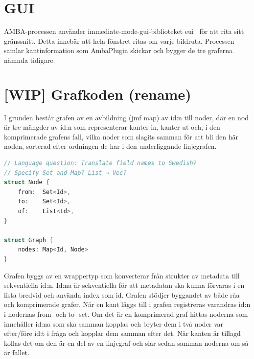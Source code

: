 
\section{GUI}
AMBA-processen använder immediate-mode-gui-biblioteket eui~\cite{egui}
för att rita sitt gränssnitt. Detta innebär att hela fönstret ritas om
varje bildruta. Processen samlar kantinformation som AmbaPlugin
skickar och bygger de tre graferna nämnda tidigare.

\section{[WIP] Grafkoden (rename)}
I grunden består grafen av en avbildning (jmf map) av id:n till noder,
där en nod är tre mängder av id:n som representerar kanter in, kanter
ut och, i den komprimerade grafens fall, vilka noder som slagits
samman för att bli den här noden, sorterad efter ordningen de har i
den underliggande linjegrafen.

\begin{lstlisting}[label={list:third}, language=Swift]
// Language question: Translate field names to Swedish?
// Specify Set and Map? List → Vec?
struct Node {
    from:  Set<Id>,
    to:    Set<Id>,
    of:    List<Id>,
}

struct Graph {
    nodes: Map<Id, Node>
}
\end{lstlisting}

Grafen byggs av en wrappertyp som konverterar från strukter av
metadata till sekventiella id:n. Id:na är sekventiella för att
metadatan ska kunna förvaras i en lista bredvid och använda index som
id. Grafen stödjer byggandet av både råa och komprimerade grafer. När
en kant läggs till i grafen registreras varandras id:n i nodernas
from- och to- set. Om det är en komprimerad graf hittas noderna som
innehåller id:na som ska samman kopplas och bryter dem i två noder var
efter/före id:t i fråga och kopplar dem samman efter det. När kanten
är tillagd kollas det om den är en del av en linjegraf och slår sedan
samman noderna om så är fallet.

